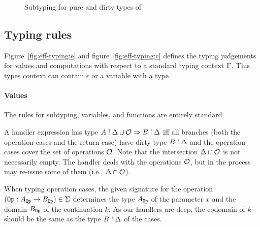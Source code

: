 \begin{figure}[!htb]
\begin{center}
\end{center}
\caption{Subtyping for pure and dirty types of \eff}\label{fig:subtyping}
\end{figure}

\subsection{Typing rules}
Figure~\ref{fig:eff-typing:e} and figure~\ref{fig:eff-typing:c} defines the typing judgements for values and computations with respect to a standard typing context $\Gamma$. This types context can contain $\epsilon$ or a variable with a type.

\paragraph{Values}
The rules for subtyping, variables, and functions are entirely standard.

A handler expression has type $A \mathrel{!} \Delta \cup \mathcal{O} \Rightarrow B \mathrel{!} \Delta$ iff all branches (both the operation cases and the return case) have dirty type $B \mathrel{!} \Delta$ and the operation cases cover the set of operations $\mathcal{O}$. Note that the intersection $\Delta \cap \mathcal{O}$ is not necessarily empty. The handler deals with the operations $\mathcal{O}$, but in the process may re-issue some of them (i.e., $\Delta \cap \mathcal{O}$).

When typing operation cases, the given signature for the operation $(\mathtt{Op} \mathrel{:} A_{\mathtt{Op}} \to B_{\mathtt{Op}}) \in \Sigma$ determines the type $A_{\mathtt{Op}}$ of the parameter $x$ and the domain $B_{\mathtt{Op}}$ of the continuation $k$. As our handlers are deep, the codomain of $k$ should be the same as the type $B \mathrel{!} \Delta$ of the cases. \cite{inferring}

